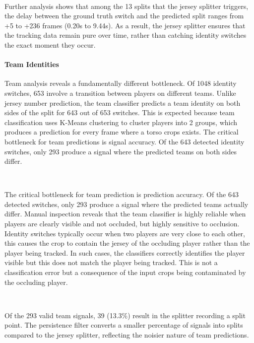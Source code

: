 \

Further analysis shows that among the 13 splits that the jersey splitter triggers, the delay between the ground truth switch and the predicted split ranges from +5 to +236 frames (0.20s to 9.44s). As a result, the jersey splitter ensures that the tracking data remain pure over time, rather than catching identity switches the exact moment they occur.


\paragraph{Team Identities}
Team analysis reveals a fundamentally different bottleneck. Of 1048 identity switches, 653 involve a transition between players on different teams. Unlike jersey number prediction, the team classifier predicts a team identity on both sides of the split for 643 out of 653 switches. This is expected because team classification uses K-Means clustering to cluster players into 2 groups, which produces a prediction for every frame where a torso crops exists. The critical bottleneck for team predictions is signal accuracy. Of the 643 detected identity switches, only 293 produce a signal where the predicted teams on both sides differ.

\

The critical bottleneck for team prediction is prediction accuracy. Of the 643 detected switches, only 293 produce a signal where the predicted teams actually differ. Manual inspection reveals that the team classifier is highly reliable when players are clearly visible and not occluded, but highly sensitive to occlusion. Identity switches typically occur when two players are very close to each other, this causes the crop to contain the jersey of the occluding player rather than the player being tracked. In such cases, the classifiers correctly identifies the player visible but this does not match the player being tracked. This is not a classification error but a consequence of the input crops being contaminated by the occluding player. 

\

Of the 293 valid team signals, 39 (13.3\%) result in the splitter recording a split point. The persistence filter converts a smaller percentage of signals into splits compared to the jersey splitter, reflecting the noisier nature of team predictions.


